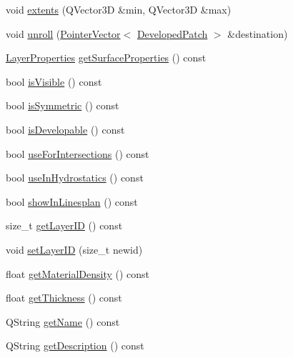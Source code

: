 \begin{DoxyCompactItemize}
\item 
void \hyperlink{classShipCAD_1_1SubdivisionLayer_a2fc3ac326021a97479b821331e295640}{extents} (Q\+Vector3D \&min, Q\+Vector3D \&max)
\item 
void \hyperlink{classShipCAD_1_1SubdivisionLayer_a716ee3981e86d5171f392bbee9b7a9da}{unroll} (\hyperlink{classPointerVector}{Pointer\+Vector}$<$ \hyperlink{classShipCAD_1_1DevelopedPatch}{Developed\+Patch} $>$ \&destination)
\item 
\hyperlink{structShipCAD_1_1LayerProperties}{Layer\+Properties} \hyperlink{classShipCAD_1_1SubdivisionLayer_aee60763cd9524debb45f4a04e46676f2}{get\+Surface\+Properties} () const 
\item 
bool \hyperlink{classShipCAD_1_1SubdivisionLayer_adb65832883b6d2c88803d62edb48588b}{is\+Visible} () const 
\item 
bool \hyperlink{classShipCAD_1_1SubdivisionLayer_af1d37cf069e050828f42c034ada4661e}{is\+Symmetric} () const 
\item 
bool \hyperlink{classShipCAD_1_1SubdivisionLayer_a0e2bfd18bf3fa23e51f88b20da7d2ca6}{is\+Developable} () const 
\item 
bool \hyperlink{classShipCAD_1_1SubdivisionLayer_af3f52bfd03df9387d2cc294a3207cbe5}{use\+For\+Intersections} () const 
\item 
bool \hyperlink{classShipCAD_1_1SubdivisionLayer_a1d2811b35f699b4eda6a08b543863096}{use\+In\+Hydrostatics} () const 
\item 
bool \hyperlink{classShipCAD_1_1SubdivisionLayer_a3c98d0ab16464fc2e3295ad546acd2e3}{show\+In\+Linesplan} () const 
\item 
size\+\_\+t \hyperlink{classShipCAD_1_1SubdivisionLayer_a0f334fb0ec1774fbff8d60aa8a9b6889}{get\+Layer\+ID} () const 
\item 
void \hyperlink{classShipCAD_1_1SubdivisionLayer_ad6cbb87ecaadd6c31635fb86fe1a4b13}{set\+Layer\+ID} (size\+\_\+t newid)
\item 
float \hyperlink{classShipCAD_1_1SubdivisionLayer_a283686d7588a2e6e7a047c2fea65ddc6}{get\+Material\+Density} () const 
\item 
float \hyperlink{classShipCAD_1_1SubdivisionLayer_a4923525b6c8c111be4959e2fac45d24f}{get\+Thickness} () const 
\item 
Q\+String \hyperlink{classShipCAD_1_1SubdivisionLayer_a22eacfdf763840d534d45b18b789f8c7}{get\+Name} () const 
\item 
Q\+String \hyperlink{classShipCAD_1_1SubdivisionLayer_af97c006adcbaad6faa7dfcb69a2c904e}{get\+Description} () const 

\end{DoxyCompactItemize}
